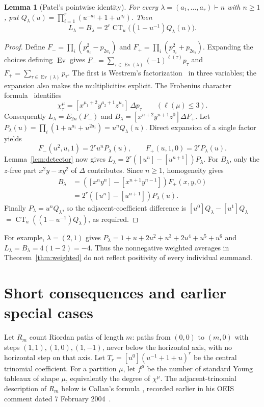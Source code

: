 \documentclass[11pt]{article}
\newcommand{\Ev}{\operatorname{Ev}}
\newcommand{\CT}{\operatorname{CT}}
\newtheorem{lemma}[theorem]{Lemma}
\begin{document}
\begin{lemma}[Patel's pointwise identity]\label{lem:pointwise}
For every $\lambda=(a_1,\ldots,a_r)\vdash n$ with $n\geq1$, put
$Q_\lambda(u)=\prod_{i=1}^r(u^{-a_i}+1+u^{a_i})$. Then
\begin{equation}\label{eq:pointwise}
 L_\lambda=B_\lambda=2^r\CT_u\bigl((1-u^{-1})Q_\lambda(u)\bigr).
\end{equation}
\end{lemma}
\begin{proof}
Define $F_- =\prod_i(p_{a_i}^2-p_{2a_i})$ and
$F_+ =\prod_i(p_{a_i}^2+p_{2a_i})$.
Expanding the choices defining $\Ev$ gives
$F_-=\sum_{\tau\in\Ev(\lambda)}(-1)^{\ell(\tau)}p_\tau$ and
$F_+=\sum_{\tau\in\Ev(\lambda)}p_\tau$.
The first is Westrem's factorization~\cite{W} in three variables;
the expansion also makes the multiplicities explicit.
The Frobenius character formula~\cite[Lemma 7 and equation (5.2)]{HSW}
identifies
\[
 \chi^\mu_\tau=[x^{\mu_1+2}y^{\mu_2+1}z^{\mu_3}]\,\Delta p_\tau
 \qquad(\ell(\mu)\leq3).
\]
Consequently $L_\lambda=E_{2n}(F_-)$ and
$B_\lambda=[x^{n+2}y^{n+1}z^0]\Delta F_+$.
Let $P_\lambda(u)=\prod_i(1+u^{a_i}+u^{2a_i})=u^nQ_\lambda(u)$.
Direct expansion of a single factor yields
\[
 F_-(u^2,u,1)=2^ru^nP_\lambda(u),\qquad
 F_+(u,1,0)=2^rP_\lambda(u).
\]
Lemma~\ref{lem:detector} now gives
$L_\lambda=2^r([u^n]-[u^{n+1}])P_\lambda$.
For $B_\lambda$, only the $z$-free part $x^2y-xy^2$ of $\Delta$
contributes. Since $n\geq1$, homogeneity gives
\begin{align*}
 B_\lambda
 &=([x^ny^n]-[x^{n+1}y^{n-1}])F_+(x,y,0)\\
 &=2^r([u^n]-[u^{n+1}])P_\lambda(u).
\end{align*}
Finally $P_\lambda=u^nQ_\lambda$, so the adjacent-coefficient difference
is $[u^0]Q_\lambda-[u^1]Q_\lambda$
$=\CT_u((1-u^{-1})Q_\lambda)$, as required.
\end{proof}

For example, $\lambda=(2,1)$ gives
$P_\lambda=1+u+2u^2+u^3+2u^4+u^5+u^6$ and
$L_\lambda=B_\lambda=4(1-2)=-4$.
Thus the nonnegative weighted averages in Theorem~\ref{thm:weighted} do not
reflect positivity of every individual summand.

\section{Short consequences and earlier special cases}
Let $R_m$ count Riordan paths of length $m$: paths from $(0,0)$ to
$(m,0)$ with steps $(1,1),(1,0),(1,-1)$, never below the horizontal
axis, with no horizontal step on that axis. Let
$T_r=[u^0](u^{-1}+1+u)^r$ be the central trinomial coefficient.
For a partition $\mu$, let $f^\mu$ be the number of standard Young tableaux
of shape $\mu$, equivalently the degree of $\chi^\mu$.
The adjacent-trinomial description of $R_m$ below is Callan's formula
\cite{C}, recorded earlier in his OEIS comment dated 7 February 2004~\cite{OEIS}.
\end{document}
